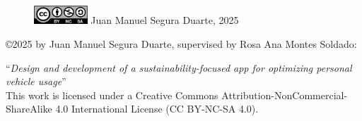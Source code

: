 \vspace*{\fill}

\begin{figure}[H]
    \includegraphics[width=2cm]{images/by-nc-sa.png} Juan Manuel Segura Duarte, 2025
\end{figure}

\copyright 2025 by Juan Manuel Segura Duarte, supervised by Rosa Ana Montes Soldado:

``\textit{Design and development of a sustainability-focused app for optimizing personal vehicle usage}'' \\

This work is licensed under a Creative Commons Attribution-NonCommercial-ShareAlike 4.0 International License (CC BY-NC-SA 4.0).

